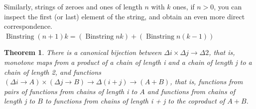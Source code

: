 \documentclass{proc-l}
\newtheorem{theorem}{Theorem}[section]
\theoremstyle{definition}
\theoremstyle{remark}
\numberwithin{equation}{section}
\begin{document}
Similarly, strings of zeroes and ones of length \(n\) with \(k\) ones, if \(n > 0\), you can inspect the first (or last) element of the string, and obtain an even more direct correspondence. \(\operatorname{Binstring} (n+1) k = (\operatorname{Binstring} n k) + (\operatorname{Binstring} n (k-1))\)


\begin{theorem}
There is a canonical bijection between \(\Delta i \times \Delta j \to \Delta 2\), that is, monotone maps from a product of a chain of length i and a chain of length j to a chain of length 2, and functions \((\Delta i \to A) \times (\Delta j \to B) \to \Delta (i + j) \to (A + B)\),
that is, functions from pairs of functions from chains of length i to \(A\) and functions from chains of length j to \(B\) to functions from chains of length i + j to the coproduct of \(A + B\).
\end{theorem}
\end{document}
